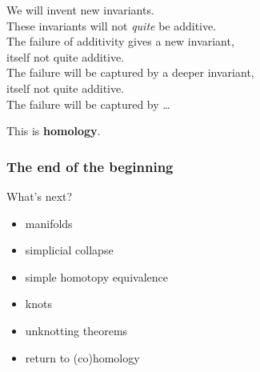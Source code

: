 \documentclass[14pt]{beamer}
\begin{document}
\begin{frame}

  We will invent new invariants. \\
  These invariants will not \textit{quite} be additive. \\
  The failure of additivity gives a new invariant, \\
  \quad itself not quite additive. \\
  The failure will be captured by a deeper invariant, \\
  \quad itself not quite additive. \\
  The failure will be captured by \ldots

  \vfill

  This is \textbf{homology}.
 
\end{frame}

\begin{frame}
\frametitle{The end of the beginning}

What's next?
\begin{itemize}
\item manifolds
\item simplicial collapse
\item simple homotopy equivalence
\item knots
\item unknotting theorems
\item return to (co)homology
\end{itemize}

\end{frame}

\end{document}
